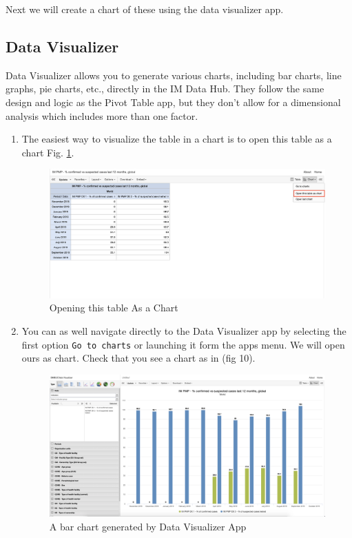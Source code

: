 \documentclass[]{book}
\providecommand{\tightlist}{%
  \setlength{\itemsep}{0pt}\setlength{\parskip}{0pt}}
\begin{document}
Next we will create a chart of these using the data visualizer app.

\hypertarget{visualizer}{%
\subsection{Data Visualizer}\label{visualizer}}

Data Visualizer allows you to generate various charts, including bar charts, line graphs, pie charts, etc., directly in the IM Data Hub. They follow the same design and logic as the Pivot Table app, but they don't allow for a dimensional analysis which includes more than one factor.

\begin{enumerate}
\def\labelenumi{\arabic{enumi}.}
\tightlist
\item
  The easiest way to visualize the table in a chart is to open this table as a chart Fig. \ref{fig:visualizer}.

  \begin{figure}
  \includegraphics[width=34.69in]{./images/visualizer} \caption{Opening this table As a Chart}\label{fig:visualizer}
  \end{figure}
\item
  You can as well navigate directly to the Data Visualizer app by selecting the first option \texttt{Go\ to\ charts} or launching it form the apps menu. We will open ours as chart. Check that you see a chart as in (fig 10).

  \begin{figure}
  \includegraphics[width=46.64in]{./images/visualizer2} \caption{A bar chart generated by Data Visualizer App}\label{fig:visualizer2}
  \end{figure}
\end{enumerate}
\end{document}
